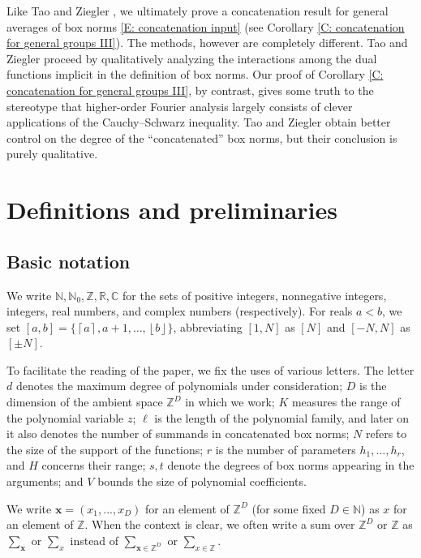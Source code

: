 \documentclass[11pt]{amsart}
\theoremstyle{definition}
\newcommand{\C}{{\mathbb C}}
\newcommand{\N}{{\mathbb N}}
\newcommand{\R}{{\mathbb R}}
\newcommand{\Z}{{\mathbb Z}}
\newcommand{\x}{{\textbf{x}}}
\newcommand{\bx}{{\textbf{x}}}
\newcommand{\floor}[1]{\left \lfloor #1 \right \rfloor}
\newcommand{\ceil}[1]{\left \lceil #1 \right \rceil}
\begin{document}
Like Tao and Ziegler \cite{TZ16}, we ultimately prove a concatenation result for general averages of box norms \eqref{E: concatenation input} (see Corollary \ref{C: concatenation for general groups III}). The methods, however are completely different. Tao and Ziegler proceed by qualitatively analyzing the interactions among the dual functions implicit in the definition of box norms.  
Our proof of Corollary \ref{C: concatenation for general groups III}, by contrast, {gives some truth to the stereotype that higher-order Fourier analysis largely consists of clever applications of the Cauchy--Schwarz inequality.}
Tao and Ziegler obtain better control on the degree of the ``concatenated'' box norms, but their conclusion is purely qualitative. 





\section{Definitions and preliminaries}\label{S: definitions}
\subsection{Basic notation}
We write $\N, \N_0,\Z, \R, \C$ for the sets of positive integers, nonnegative integers, integers, real numbers, and complex numbers (respectively). For reals $a<b$, we set $[a,b] = \{\ceil{a}, a+1, \ldots, \floor{b}\}$, abbreviating $[1,N]$ as $[N]$ and $[-N,N]$ as $[\pm N]$.

To facilitate the reading of the paper, we fix the uses of various letters. The letter $d$ denotes the maximum degree of polynomials under consideration; $D$ is the dimension of the ambient space $\Z^D$ in which we work; $K$ measures the range of the polynomial variable $z$; $\ell$ is the length of the polynomial family, and later on it also denotes the number of summands in concatenated box norms; $N$ refers to the {size of the} support of the functions; $r$ is the number of parameters $h_1, \ldots, h_r$, and $H$ concerns their range; $s,t$ denote the degrees of box norms appearing in the arguments; and $V$ bounds the size of polynomial coefficients.

We write $\x = (x_1, ..., x_D)$ for an element of $\Z^D$ (for some fixed $D\in\N$) as $x$ for an element of $\Z$. When the context is clear, we often write a sum over $\Z^D$ or $\Z$ as $\sum_{\bx}$ or $\sum_x$ instead of $\sum_{\bx \in \Z^D}$ or $\sum_{x \in \Z}$.
\end{document}
